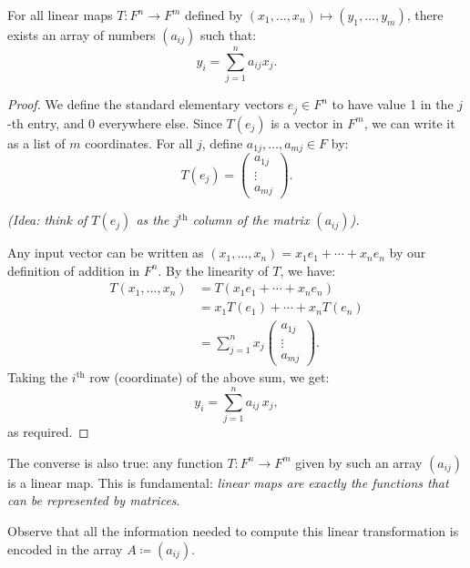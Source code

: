 \documentclass[../linear_algebra_and_groups.tex]{subfiles}
\begin{document}
\begin{theorem}
    \begin{shaded*}
        For all linear maps $T:F^n\to F^m$ defined by $(x_1,\dots,x_n)\mapsto(y_1,\dots,y_m)$, there exists an array of numbers $(a_{ij})$ such that:
        $$y_i=\sum_{j=1}^n a_{ij}x_j.$$
    \end{shaded*}
\end{theorem}
\begin{proof}
    We define the standard elementary vectors $e_j\in F^n$ to have value 1 in the $j$-th entry, and 0 everywhere else.
    Since $T(e_j)$ is a vector in $F^m$, we can write it as a list of $m$ coordinates. For all $j$, define $a_{1j},\dots,a_{mj} \in F$ by:
    $$T(e_j) = \begin{pmatrix} a_{1j} \\ \vdots \\ a_{mj} \end{pmatrix}.$$
    
    \textit{(Idea: think of $T(e_j)$ as the $j^{\mathrm{th}}$ column of the matrix $(a_{ij})$).}
    
    Any input vector can be written as $(x_1,\dots,x_n)=x_1e_1+\cdots+x_ne_n$ by our definition of addition in $F^n$. By the linearity of $T$, we have:
    \begin{align*}
        T(x_1,\dots,x_n) &= T(x_1e_1+\cdots+x_ne_n) \\
        &= x_1T(e_1)+\cdots+x_nT(e_n) \\
        &= \sum_{j=1}^n x_j \begin{pmatrix} a_{1j} \\ \vdots \\ a_{mj} \end{pmatrix}.
    \end{align*}
    Taking the $i^{\mathrm{th}}$ row (coordinate) of the above sum, we get:
    $$y_i = \sum_{j=1}^n a_{ij}\,x_j,$$
    as required.
    \qedhere
\end{proof}

\begin{remark}
    The converse is also true: any function $T:F^n\to F^m$ given by such an array $(a_{ij})$ is a linear map. This is fundamental: \textit{linear maps are exactly the functions that can be represented by matrices}.
\end{remark}

Observe that all the information needed to compute this linear transformation is encoded in the array $A\coloneqq(a_{ij})$. 
\end{document}

